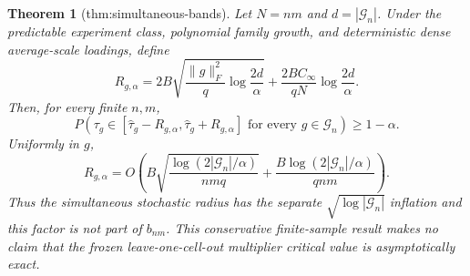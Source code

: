 \documentclass{article}
\newtheorem{theorem}{Theorem}
\begin{document}
\begin{theorem}[thm:simultaneous-bands]\label{thm:simultaneous-bands}
Let \(N=nm\) and \(d=|\mathcal G_n|\).  Under the predictable experiment class, polynomial family growth, and deterministic dense average-scale loadings, define
\[
 R_{g,\alpha}=2B\sqrt{\frac{\lVert g\rVert_F^2}{q}\log\!\frac{2d}{\alpha}}
 +\frac{2BC_\infty}{qN}\log\!\frac{2d}{\alpha}.
\]
Then, for every finite \(n,m\),
\[
 P\!\left(\tau_g\in[\widehat\tau_g-R_{g,\alpha},
 \widehat\tau_g+R_{g,\alpha}]\text{ for every }g\in\mathcal G_n\right)
 \ge1-\alpha.
\]
Uniformly in \(g\),
\[
 R_{g,\alpha}=O\!\left(
 B\sqrt{\frac{\log(2|\mathcal G_n|/\alpha)}{nmq}}
 +\frac{B\log(2|\mathcal G_n|/\alpha)}{qnm}\right).
\]
Thus the simultaneous stochastic radius has the separate \(\sqrt{\log|\mathcal G_n|}\) inflation and this factor is not part of \(b_{nm}\).  This conservative finite-sample result makes no claim that the frozen leave-one-cell-out multiplier critical value is asymptotically exact.
\end{theorem}
\end{document}
